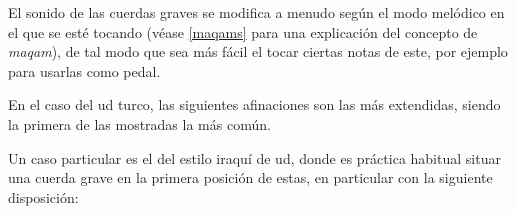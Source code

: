 El sonido de las cuerdas graves se modifica a menudo según el modo melódico en el que se esté tocando (véase \ref{maqams} para una explicación del concepto de \emph{maqam}), de tal modo que sea más fácil el tocar ciertas notas de este, por ejemplo para usarlas como pedal.

En el caso del ud turco, las siguientes afinaciones son las más extendidas, siendo la primera de las mostradas la más común.

\begin{center}
\end{center}

Un caso particular es el del estilo iraquí de ud, donde es práctica habitual situar una cuerda grave en la primera posición de estas, en particular con la siguiente disposición:

\begin{center}
\end{center}


